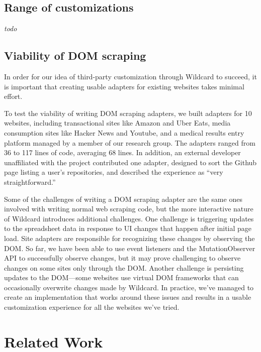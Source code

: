 \documentclass[sigplan,10pt,anonymous,review]{acmart}
\begin{document}
\hypertarget{range-of-customizations}{%
\subsection{Range of customizations}\label{range-of-customizations}}

\emph{todo}

\hypertarget{viability-of-dom-scraping}{%
\subsection{Viability of DOM scraping}\label{viability-of-dom-scraping}}

In order for our idea of third-party customization through Wildcard to
succeed, it is important that creating usable adapters for existing
websites takes minimal effort.

To test the viability of writing DOM scraping adapters, we built
adapters for 10 websites, including transactional sites like Amazon and
Uber Eats, media consumption sites like Hacker News and Youtube, and a
medical results entry platform managed by a member of our research
group. The adapters ranged from 36 to 117 lines of code, averaging 68
lines. In addition, an external developer unaffiliated with the project
contributed one adapter, designed to sort the Github page listing a
user's repositories, and described the experience as ``very
straightforward.''

Some of the challenges of writing a DOM scraping adapter are the same
ones involved with writing normal web scraping code, but the more
interactive nature of Wildcard introduces additional challenges. One
challenge is triggering updates to the spreadsheet data in response to
UI changes that happen after initial page load. Site adapters are
responsible for recognizing these changes by observing the DOM. So far,
we have been able to use event listeners and the MutationObserver API to
successfully observe changes, but it may prove challenging to observe
changes on some sites only through the DOM. Another challenge is
persisting updates to the DOM---some websites use virtual DOM frameworks
that can occasionally overwrite changes made by Wildcard. In practice,
we've managed to create an implementation that works around these issues
and results in a usable customization experience for all the websites
we've tried.

\hypertarget{sec:related-work}{%
\section{Related Work}\label{sec:related-work}}
\end{document}

